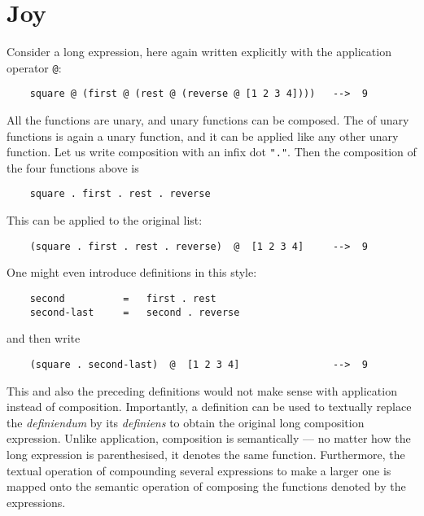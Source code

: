 \section{Joy}
\par
Consider a long expression, here again written explicitly with
the application operator \verb#@#:
\begin{verbatim}
    square @ (first @ (rest @ (reverse @ [1 2 3 4])))   -->  9
\end{verbatim}
All the functions are unary, and unary functions can be composed.
The  of unary functions is again a unary function,
and it can be applied like any other unary function.
Let us write composition with an infix dot \verb#"."#.
Then the composition of the four functions above is
\begin{verbatim}
    square . first . rest . reverse
\end{verbatim}
This can be applied to the original list:
\begin{verbatim}
    (square . first . rest . reverse)  @  [1 2 3 4]     -->  9
\end{verbatim}
One might even introduce definitions in this style:
\begin{verbatim}
    second          =   first . rest
    second-last     =   second . reverse
\end{verbatim}
and then write
\begin{verbatim}
    (square . second-last)  @  [1 2 3 4]                -->  9
\end{verbatim}
This and also the preceding definitions would not make sense with
application instead of composition.
Importantly, a definition can be used to textually replace
the {\em definiendum} by its {\em definiens}
to obtain the original long composition expression.
Unlike application,
composition is semantically  ---
no matter how the long expression is parenthesised,
it denotes the same function.
Furthermore, the textual operation of compounding several
expressions to make a larger one is mapped onto the
semantic operation of composing the functions denoted by the expressions.
\par

